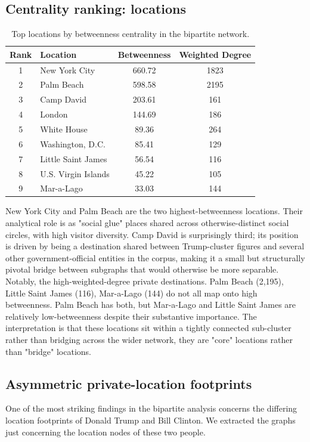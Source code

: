 \subsection{Centrality ranking: locations}
\begin{table}[H]
    \centering
    \begin{tabular}{c l c c}
        \toprule
        Rank & Location & Betweenness & Weighted Degree \\
        \midrule
            1 & New York City & 660.72 & 1823 \\
            2 & Palm Beach & 598.58 & 2195 \\
            3 & Camp David & 203.61 & 161 \\
            4 & London & 144.69 & 186 \\
            5 & White House & 89.36 & 264 \\
            6 & Washington, D.C. & 85.41 & 129 \\
            7 & Little Saint James & 56.54 & 116 \\
            8 & U.S. Virgin Islands & 45.22 & 105 \\
            9 & Mar-a-Lago & 33.03 & 144 \\
        \bottomrule
    \end{tabular}
    \caption{Top locations by betweenness centrality in the bipartite network.}
    \label{tab:bipartite_locations}
\end{table}
New York City and Palm Beach are the two highest-betweenness locations. Their analytical role is as "social glue" places shared across otherwise-distinct social circles, with high visitor diversity. Camp David is surprisingly third; its position is driven by being a destination shared between Trump-cluster figures and several other government-official entities in the corpus, making it a small but structurally pivotal bridge between subgraphs that would otherwise be more separable.
Notably, the high-weighted-degree private destinations. Palm Beach (2,195), Little Saint James (116), Mar-a-Lago (144) do not all map onto high betweenness. Palm Beach has both, but Mar-a-Lago and Little Saint James are relatively low-betweenness despite their substantive importance. The interpretation is that these locations sit within a tightly connected sub-cluster rather than bridging across the wider network, they are "core" locations rather than "bridge" locations.
\subsection{Asymmetric private-location footprints}
One of the most striking findings in the bipartite analysis concerns the differing location footprints of Donald Trump and Bill Clinton. We extracted the graphs just concerning the location nodes of these two people.

